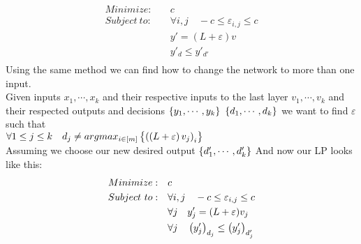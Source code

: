 \documentclass{article}
\begin{document}
\begin{align*}
    Minimize:\quad & c \\
    Subject\ to:\quad & \forall i,j\quad -c \leq\varepsilon_{i,j}\leq c\\
    & y'=(L+\varepsilon)v \\
    & y'_d \leq y'_{d'}\\
\end{align*}
Using the same method we can find how to change the network to more than one input.\\
Given inputs $x_1,\cdots,x_k$ and their respective inputs to the last layer $v_1,\cdots,v_k$ and their respected outputs and decisions $\bracketsC{y_1,\cdots,y_k}\ \bracketsC{d_1,\cdots,d_k}$ we want to find $\varepsilon$ such that\\
$\forall 1\leq j\leq k\quad d_j \neq argmax_{i\in\left[m\right]}\left\lbrace \left(\left(L+\varepsilon\right)v_j\right)_i\right\rbrace$\\
Assuming we choose our new desired output $\left\lbrace d'_1,\cdots,d'_k\right\rbrace$
And now our LP looks like this:\\
\begin{align*}
    Minimize:\quad & c \\
    Subject\ to:\quad & \forall i,j\quad -c \leq\varepsilon_{i,j}\leq c\\
    & \forall j\quad y'_j=(L+\varepsilon)v_j \\
    & \forall j\quad \left(y'_j\right)_{d_j} \leq \left(y'_j\right)_{d'_j}\\
\end{align*}
\end{document}
